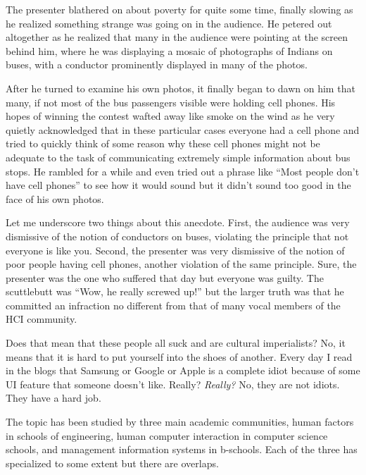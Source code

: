 The presenter blathered on about poverty for quite some time, finally
slowing as he realized something strange was going on in the audience.
He petered out altogether as he realized that many in the audience were
pointing at the screen behind him, where he was displaying a mosaic of
photographs of Indians on buses, with a conductor prominently displayed
in many of the photos.

After he turned to examine his own photos, it finally began to dawn on
him that many, if not most of the bus passengers visible were holding
cell phones. His hopes of winning the contest wafted away like smoke on
the wind as he very quietly acknowledged that in these particular cases
everyone had a cell phone and tried to quickly think of some reason why
these cell phones might not be adequate to the task of communicating
extremely simple information about bus stops. He rambled for a while and
even tried out a phrase like ``Most people don't have cell phones'' to
see how it would sound but it didn't sound too good in the face of his
own photos.

Let me underscore two things about this anecdote. First, the audience
was very dismissive of the notion of conductors on buses, violating the
principle that not everyone is like you. Second, the presenter was very
dismissive of the notion of poor people having cell phones, another
violation of the same principle. Sure, the presenter was the one who
suffered that day but everyone was guilty. The scuttlebutt was ``Wow, he
really screwed up!'' but the larger truth was that he committed an
infraction no different from that of many vocal members of the HCI
community.

Does that mean that these people all suck and are cultural imperialists?
No, it means that it is hard to put yourself into the shoes of another.
Every day I read in the blogs that Samsung or Google or Apple is a
complete idiot because of some UI feature that someone doesn't like.
Really? \emph{Really?} No, they are not idiots. They have a hard job.

\hypertarget{audience}{%
\label{audience}}

\hypertarget{academic-communities}{%
\label{academic-communities}}

The topic has been studied by three main academic communities, human
factors in schools of engineering, human computer interaction in
computer science schools, and management information systems in
b-schools. Each of the three has specialized to some extent but there
are overlaps.


